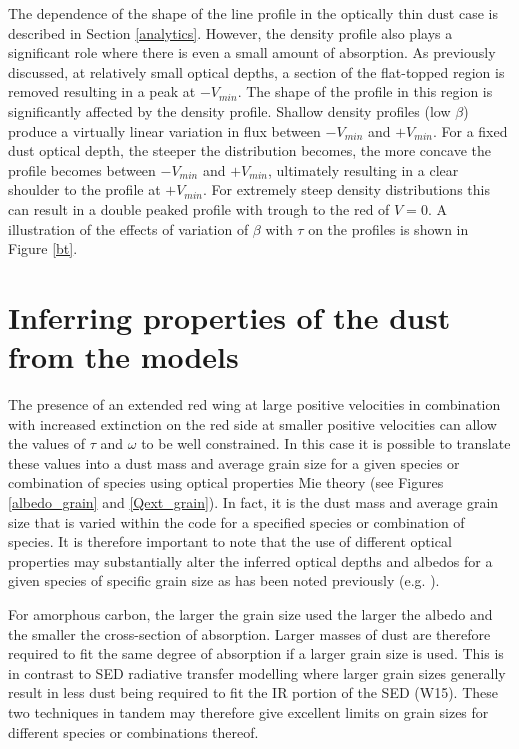 The dependence of the shape of the line profile in the optically thin dust case 
is described in Section \ref{analytics}.  However, the density profile 
also plays a significant role where there is even a small amount of 
absorption.  As previously discussed, at relatively small optical depths, 
a section of the flat-topped region is removed resulting in a peak at 
$-V_{min}$.  The shape of the profile in this region is significantly 
affected by the density profile.  Shallow density profiles (low $\beta$) produce a virtually 
linear variation in flux between $-V_{min}$ and $+V_{min}$.  For a fixed dust
optical depth, the steeper the distribution becomes, the more concave the 
profile becomes between $-V_{min}$ and $+V_{min}$, ultimately resulting in 
a clear shoulder to the profile at $+V_{min}$.  For extremely steep density
distributions this can result in a double peaked profile with 
trough to the red of $V=0$.  A illustration of the effects of variation of 
$\beta$ with $\tau$ on the profiles is shown in Figure \ref{bt}.

\section{Inferring properties of the dust from the models}

The presence of an extended red wing at large positive velocities in 
combination with increased extinction on the red side at smaller positive 
velocities can allow the values of $\tau$ and $\omega$ to be well 
constrained.  In this case it is possible to translate these values into a 
dust mass and average grain size for a given species or combination of 
species using optical properties Mie theory (see Figures 
\ref{albedo_grain} and \ref{Qext_grain}).  In fact, it is the dust mass and average grain size 
that is varied within the code for a specified species or combination of 
species.  It is therefore important to note that the use of different 
optical properties may substantially alter the inferred optical depths and 
albedos for a given species of specific grain size as has been noted 
previously (e.g. \citet{Owen2015}).



For amorphous carbon, the larger the grain size used the larger the albedo 
and the smaller the cross-section of absorption.  Larger masses of dust 
are therefore required to fit the same degree of absorption if a larger 
grain size is used.  This is in contrast to SED radiative transfer 
modelling where larger grain sizes generally result in less dust being 
required to fit the IR portion of the SED (W15).  These two techniques in 
tandem may therefore give excellent limits on grain sizes for different 
species or combinations thereof.

